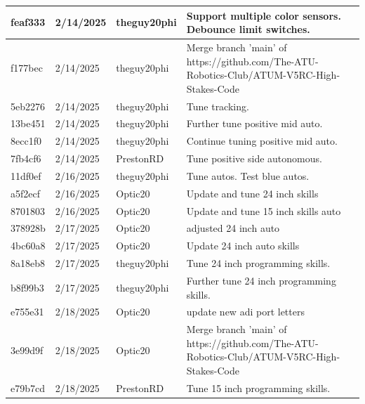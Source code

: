 \begin{center}
\begin{longtable}{|p{28pt}|p{33pt}|p{40pt}|p{300pt}|}
\hline
feaf333 & 2/14/2025 & theguy20phi & Support multiple color sensors. Debounce limit switches. \\
\hline
f177bec & 2/14/2025 & theguy20phi & Merge branch 'main' of https://github.com/The-ATU-Robotics-Club/ATUM-V5RC-High-Stakes-Code \\
\hline
5eb2276 & 2/14/2025 & theguy20phi & Tune tracking. \\
\hline
13be451 & 2/14/2025 & theguy20phi & Further tune positive mid auto. \\
\hline
8ecc1f0 & 2/14/2025 & theguy20phi & Continue tuning positive mid auto. \\
\hline
7fb4cf6 & 2/14/2025 & PrestonRD & Tune positive side autonomous. \\
\hline
11df0ef & 2/16/2025 & theguy20phi & Tune autos. Test blue autos. \\
\hline
a5f2ecf & 2/16/2025 & Optic20 & Update and tune 24 inch skills \\
\hline
8701803 & 2/16/2025 & Optic20 & Update and tune 15 inch skills auto \\
\hline
378928b & 2/17/2025 & Optic20 & adjusted 24 inch auto \\
\hline
4bc60a8 & 2/17/2025 & Optic20 & Update 24 inch auto skills \\
\hline
8a18eb8 & 2/17/2025 & theguy20phi & Tune 24 inch programming skills. \\
\hline
b8f99b3 & 2/17/2025 & theguy20phi & Further tune 24 inch programming skills. \\
\hline
e755e31 & 2/18/2025 & Optic20 & update new adi port letters \\
\hline
3e99d9f & 2/18/2025 & Optic20 & Merge branch 'main' of https://github.com/The-ATU-Robotics-Club/ATUM-V5RC-High-Stakes-Code \\
\hline
e79b7cd & 2/18/2025 & PrestonRD & Tune 15 inch programming skills. \\
\hline
\end{longtable}
\end{center}
